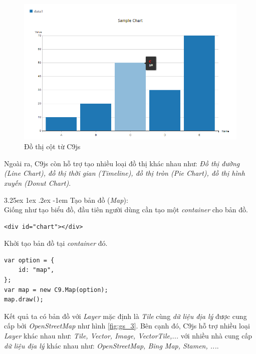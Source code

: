 \documentclass[12pt,a4paper]{article}
\makeatletter
\newcommand{\myparagraph}[1]{\paragraph{#1}\mbox{}\\} %
\renewcommand\paragraph{\@startsection{paragraph}{5}{\z@}%
  {3.25ex \@plus1ex \@minus.2ex}%
  {-1em}%
  {\normalfont\normalsize\bfseries}}
\makeatother
\begin{document}
\begin{figure}[!h]
	\begin{center}
    \includegraphics[scale=.7]{image/gs_2}
    \caption{Đồ thị cột từ C9js}
    \label{fig:gs_2}
	\end{center}
\end{figure}

Ngoài ra, C9js còn hỗ trợ tạo nhiều loại đồ thị khác nhau như: \textit{Đồ thị đường (Line Chart), đồ thị thời gian (Timeline), đồ thị tròn (Pie Chart), đồ thị hình xuyến (Donut Chart)}.

\myparagraph{Tạo bản đồ (\textit{Map}):}
Giống như tạo biểu đồ, đầu tiên người dùng cần tạo một \textit{container} cho bản đồ.

\begin{lstlisting}[caption=Tạo \textit{container} để chứa bản đồ]
<div id="chart"></div>
\end{lstlisting}

Khởi tạo bản đồ tại \textit{container} đó.

\begin{lstlisting}[caption=Khởi tạo bản đồ với C9js]
var option = {
    id: "map",
};
var map = new C9.Map(option);
map.draw();
\end{lstlisting}

Kết quả ta có bản đồ với \textit{Layer} mặc định là \textit{Tile} cùng \textit{dữ liệu địa lý} được cung cấp bởi \textit{OpenStreetMap} như hình \ref{fig:gs_3}. Bên cạnh đó, C9js hỗ trợ nhiều loại \textit{Layer} khác nhau như: \textit{Tile, Vector, Image, VectorTile,...} với nhiều nhà cung cấp \textit{dữ liệu địa lý} khác nhau như: \textit{OpenStreetMap\cite{osm}, Bing Map\cite{bingmap}, Stamen\cite{stamen}, ...}.
\end{document}
